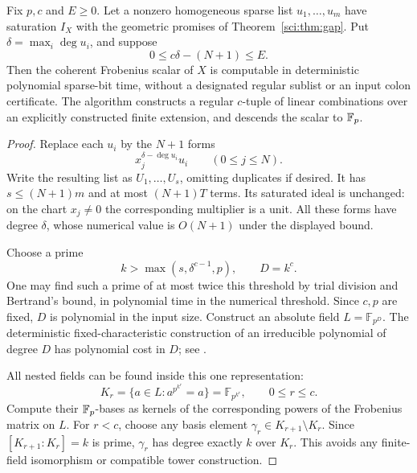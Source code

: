 \begin{theorem}
\label{sci:thm:balanced}
Fix \(p,c\) and \(E\geq0\). Let a nonzero homogeneous sparse list
\(u_1,\ldots,u_m\) have saturation \(I_X\) with the geometric promises
of Theorem~\ref{sci:thm:gap}. Put \(\delta=\max_i\deg u_i\), and suppose
\[
 0\leq c\delta-(N+1)\leq E.
\]
Then the coherent Frobenius scalar of \(X\) is computable in deterministic
polynomial sparse-bit time, without a designated regular sublist or
an input colon certificate. The algorithm constructs a regular
\(c\)-tuple of linear combinations over an explicitly constructed
finite extension, and descends the scalar to \(\mathbb F_p\).
\end{theorem}
\begin{proof}
Replace each \(u_i\) by the \(N+1\) forms
\[
 x_j^{\delta-\deg u_i}u_i\qquad(0\leq j\leq N).
 \]
Write the resulting list as \(U_1,\ldots,U_s\), omitting duplicates
if desired. It has \(s\leq(N+1)m\) and at most \((N+1)T\) terms.
Its saturated ideal is unchanged: on the chart \(x_j\ne0\) the
corresponding multiplier is a unit. All these forms have degree
\(\delta\), whose numerical value is \(O(N+1)\) under the displayed
bound.

Choose a prime
\[
 k>\max(s,\delta^{c-1},p),\qquad D=k^c.
 \]
One may find such a prime of at most twice this threshold by trial
division and Bertrand's bound, in polynomial time in the numerical
threshold. Since \(c,p\) are fixed, \(D\) is polynomial in the input
size. Construct an absolute field \(L=\mathbb F_{p^D}\).
The deterministic fixed-characteristic construction of an irreducible
polynomial of degree \(D\) has polynomial cost in \(D\);
see \citet[Theorem~3.2, author manuscript p.~3]{sci-shoup}.

All nested fields can be found inside this one representation:
\[
 K_r=\{a\in L:a^{p^{k^r}}=a\}
       =\mathbb F_{p^{k^r}},\qquad 0\leq r\leq c.
 \]
Compute their \(\mathbb F_p\)-bases as kernels of the corresponding powers
of the Frobenius matrix on \(L\). For \(r<c\), choose any basis
element \(\gamma_r\in K_{r+1}\setminus K_r\). Since
\([K_{r+1}:K_r]=k\) is prime, \(\gamma_r\) has degree exactly \(k\)
over \(K_r\). This avoids any finite-field isomorphism or compatible
tower construction.


\end{proof}
